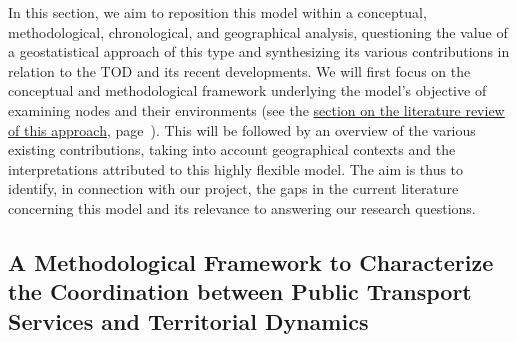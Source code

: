 \begin{refsegment}
In this section, we aim to reposition this model within a conceptual, methodological, chronological, and geographical analysis, questioning the value of a geostatistical approach of this type and synthesizing its various contributions in relation to the \acrshort{TOD} and its recent developments. We will first focus on the conceptual and methodological framework underlying the model's objective of examining nodes and their environments (see the \hyperref[chap6:litterature-concept]{section on the literature review of this approach}, page~\pageref{chap6:litterature-concept}). This will be followed by an overview of the various existing contributions, taking into account geographical contexts and the interpretations attributed to this highly flexible model. The aim is thus to identify, in connection with our project, the gaps in the current literature concerning this model and its relevance to answering our research questions.%

\subsection{A Methodological Framework to Characterize the Coordination between Public Transport Services and Territorial Dynamics
    \label{chap6:litterature-concept}
    }


\end{refsegment}
